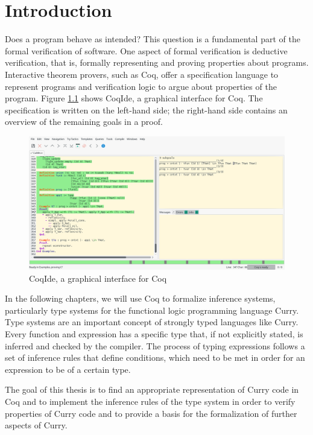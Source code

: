 \documentclass[paper = a4, fleqn, abstract=on, twoside]{scrreprt}
\begin{document}
\chapter{Introduction}
Does a program behave as intended? This question is a fundamental part of the formal verification of software. One aspect of formal verification is deductive verification, that is, formally representing and proving properties about programs.\citep{filliatre2011deductive} Interactive theorem provers, such as Coq, offer a specification language to represent programs and verification logic to argue about properties of the program. Figure \ref{coqscreen} shows CoqIde, a graphical interface for Coq. The specification is written on the left-hand side; the right-hand side contains an overview of the remaining goals in a proof.
\begin{figure}[H]
\includegraphics[width=\linewidth]{images/coq.png}
\caption{CoqIde, a graphical interface for Coq}
\label{coqscreen}
\end{figure}\noindent 
In the following chapters, we will use Coq to formalize inference systems, particularly type systems for the functional logic programming language Curry. Type systems are an important concept of strongly typed languages like Curry. Every function and expression has a specific type that, if not explicitly stated, is inferred and checked by the compiler.
The process of typing expressions follows a set of inference rules that define conditions, which need to be met in order for an expression to be of a certain type.\\
\par \noindent
The goal of this thesis is to find an appropriate representation of Curry code in Coq and to implement the inference rules of the type system in order to verify properties of Curry code and to provide a basis for the formalization of further aspects of Curry.\\
\end{document}
